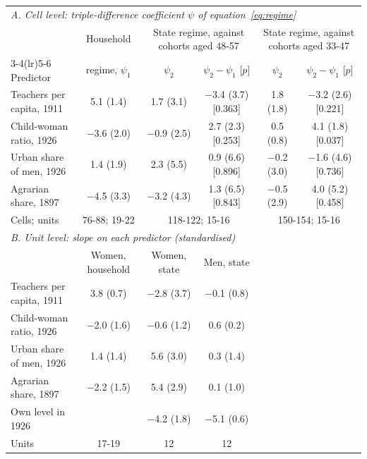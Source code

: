 \begin{tabular}{lccccc}
\toprule
\multicolumn{6}{l}{\textit{A. Cell level: triple-difference coefficient $\psi$ of equation~\eqref{eq:regime}}} \\
 & Household & \multicolumn{2}{c}{State regime, against cohorts aged 48-57} & \multicolumn{2}{c}{State regime, against cohorts aged 33-47} \\
\cmidrule(lr){3-4}\cmidrule(lr){5-6}
Predictor & regime, $\psi_1$ & $\psi_2$ & $\psi_2-\psi_1$ [$p$] & $\psi_2$ & $\psi_2-\psi_1$ [$p$] \\
\midrule
Teachers per capita, 1911 & 5.1 (1.4) & 1.7 (3.1) & $-$3.4 (3.7) [0.363] & 1.8 (1.8) & $-$3.2 (2.6) [0.221] \\
Child-woman ratio, 1926 & $-$3.6 (2.0) & $-$0.9 (2.5) & 2.7 (2.3) [0.253] & 0.5 (0.8) & 4.1 (1.8) [0.037] \\
Urban share of men, 1926 & 1.4 (1.9) & 2.3 (5.5) & 0.9 (6.6) [0.896] & $-$0.2 (3.0) & $-$1.6 (4.6) [0.736] \\
Agrarian share, 1897 & $-$4.5 (3.3) & $-$3.2 (4.3) & 1.3 (6.5) [0.843] & $-$0.5 (2.9) & 4.0 (5.2) [0.458] \\
Cells; units & 76-88; 19-22 & \multicolumn{2}{c}{118-122; 15-16} & \multicolumn{2}{c}{150-154; 15-16} \\
\midrule
\multicolumn{6}{l}{\textit{B. Unit level: slope on each predictor (standardised)}} \\
 & Women, household & Women, state & Men, state & & \\
\midrule
Teachers per capita, 1911 & 3.8 (0.7) & $-$2.8 (3.7) & $-$0.1 (0.8) & & \\
Child-woman ratio, 1926 & $-$2.0 (1.6) & $-$0.6 (1.2) & 0.6 (0.2) & & \\
Urban share of men, 1926 & 1.4 (1.4) & 5.6 (3.0) & 0.3 (1.4) & & \\
Agrarian share, 1897 & $-$2.2 (1.5) & 5.4 (2.9) & 0.1 (1.0) & & \\
Own level in 1926 & & $-$4.2 (1.8) & $-$5.1 (0.6) & & \\
Units & 17-19 & 12 & 12 & & \\
\bottomrule
\end{tabular}
